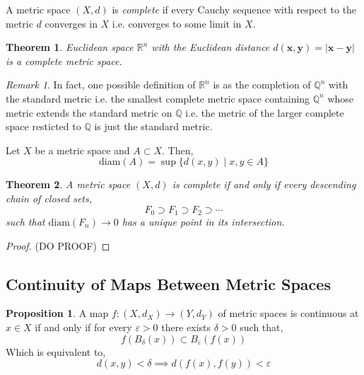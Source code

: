 \documentclass{article}
\newcommand{\ball}[2]{B_{#1} \! \left(#2 \right)}
\newcommand{\Q}{\mathbb{Q}}
\newcommand{\R}{\mathbb{R}}
\renewcommand{\bf}[1]{\mathbf{#1}}
\newenvironment{definition}[1][Definition:]{\begin{trivlist}
\item[\hskip \labelsep {\bfseries #1}]}{\end{trivlist}}
\theoremstyle{theorem}
\newtheorem{theorem}{Theorem}[section]
\theoremstyle{definition}
\theoremstyle{definition}
\newtheorem*{proposition}{Proposition}
\theoremstyle{remark}
\theoremstyle{definition}
\theoremstyle{remark}
\newtheorem{remark}{Remark}[subsection]
\begin{document}
\begin{definition}
A metric space $(X, d)$ is \textit{complete} if every Cauchy sequence with respect to the metric $d$ converges in $X$ i.e. converges to some limit in $X$.  
\end{definition}

\begin{theorem}
Euclidean space $\R^n$ with the Euclidean distance $d(\bf{x}, \bf{y}) = |\bf{x} - \bf{y}|$ is a complete metric space. 
\end{theorem}

\begin{remark}
In fact, one possible definition of $\R^n$ is as the completion of $\Q^n$ with the standard metric i.e. the smallest complete metric space containing $\Q^n$ whose metric extends the standard metric on $\Q$ i.e. the metric of the larger complete space resticted to $\Q$ is just the standard metric. 
\end{remark}

\newcommand{\diam}[1]{\mathrm{diam}\left(#1\right)}

\begin{definition}
Let $X$ be a metric space and $A \subset X$. Then,
\[ \diam{A} = \sup\{ d(x,y) \mid x,y \in A \} \]
\end{definition}

\begin{theorem}
A metric space $(X, d)$ is complete if and only if every descending chain of closed sets,
\[ F_0 \supset F_1 \supset F_2 \supset \cdots \]
such that $\diam{F_n} \to 0$ has a unique point in its intersection. 
\end{theorem}

\begin{proof}
(DO PROOF)
\end{proof}

\subsection{Continuity of Maps Between Metric Spaces}

\begin{proposition}
A map $f : (X, d_X) \to (Y, d_Y)$ of metric spaces is continuous at $x \in X$ if and only if for every $\varepsilon > 0$ there exists $\delta > 0$ such that,
\[ f(\ball{\delta}{x}) \subset \ball{\varepsilon}{f(x)} \] 
Which is equivalent to,
\[ d(x, y) < \delta \implies d(f(x), f(y)) < \varepsilon \]
\end{proposition}
\end{document}
